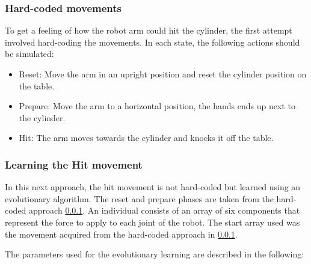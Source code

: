 \subsubsection{Hard-coded movements} \label{sec:prepare_hit_hard}

To get a feeling of how the robot arm could hit the cylinder, the first attempt involved hard-coding the movements. In each state, the following actions should be simulated:

\begin{itemize}
\item Reset: Move the arm in an upright position and reset the cylinder position on the table.
\item Prepare: Move the arm to a horizontal position, the hands ends up next to the cylinder.
\item Hit: The arm moves towards the cylinder and knocks it off the table.
\end{itemize}


\subsubsection{Learning the Hit movement} \label{sec:prepare_hit_learn_hit}

In this next approach, the hit movement is not hard-coded but learned using an evolutionary algorithm. The reset and prepare phases are taken from the hard-coded approach \ref{sec:prepare_hit_hard}. An individual consists of an array of six components that represent the force to apply to each joint of the robot. The start array used was the movement acquired from the hard-coded approach in \ref{sec:prepare_hit_hard}.

The parameters used for the evolutionary learning are described in the following: 

